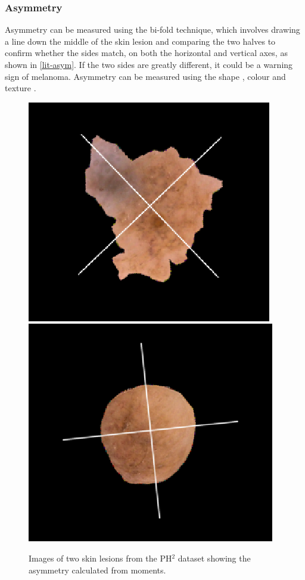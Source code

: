 \documentclass[10.5pt]{report}
\begin{document}
\subsubsection{Asymmetry}
Asymmetry can be measured using the bi-fold technique, which involves drawing a line down the middle of the skin lesion and comparing the two halves to confirm whether the sides match, on both the horizontal and vertical axes, as shown in \ref{lit-asym}. If the two sides are greatly different, it could be a warning sign of melanoma. Asymmetry can be measured using the shape \cite{Zaqout2016}, colour\cite{Kasmi2016a} and texture \cite{Ali2020a}.

\begin{figure} 
\centering
\includegraphics[scale=0.5]{asym1.png}
\includegraphics[scale=0.5]{asym2.png}
\caption{Images of two skin lesions from the PH$^2$ dataset showing the asymmetry calculated from moments.}
\end{figure} \label{lit-asym}
\end{document}
